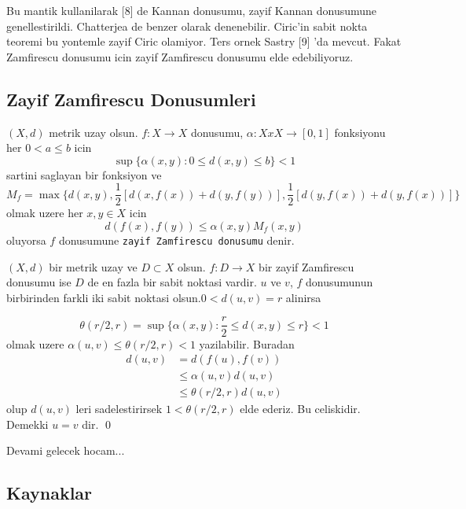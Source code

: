 \documentclass[10pt]{amsart}
\theoremstyle{plain}
\theoremstyle{definition}
\begin{document}
Bu mantik kullanilarak [8] de Kannan donusumu, zayif Kannan donusumune genellestirildi. Chatterjea de benzer olarak denenebilir. Ciric'in sabit nokta teoremi bu yontemle zayif Ciric olamiyor. Ters ornek Sastry [9] 'da mevcut. Fakat Zamfirescu donusumu icin zayif Zamfirescu donusumu elde edebiliyoruz.

\subsection*{Zayif Zamfirescu Donusumleri}
   $(X,d)$ metrik uzay olsun. $f:X \rightarrow X$ donusumu,
 $\alpha :XxX \rightarrow [0,1]$ fonksiyonu her $0<a\leq b$ icin 
\begin{equation*} 
  \sup\big\{\alpha(x,y) : 0\leq d(x,y) \leq b \big\} < 1
\end{equation*}
sartini saglayan bir fonksiyon ve
\begin{equation*} 
  M_f= \max\bigg\{ d(x,y), \frac{1}{2}[d(x,f(x))+d(y,f(y))], \frac{1}{2}[d(y,f(x))+d(y,f(x))] \bigg\}
\end{equation*}
olmak uzere her $x,y\in X$ icin
\begin{equation*} 
  d(f(x), f(y))\leq \alpha(x,y)M_f(x,y) 
\end{equation*}
oluyorsa $f$ donusumune \texttt{zayif Zamfirescu donusumu} denir.

\proposition  $(X,d)$ bir metrik uzay ve $D \subset X$ olsun. $f:D\rightarrow X$ bir zayif Zamfirescu donusumu ise $D$ de en fazla bir sabit noktasi vardir.
\kanit $u$ ve $v$, $f$ donusumunun birbirinden farkli iki sabit noktasi olsun.$0<d(u,v)=r$ alinirsa

\begin{equation*}
  \theta(r/2,r)= \sup\big\{\alpha(x,y) : \frac{r}{2}\leq d(x,y) \leq r \big\} < 1
\end{equation*}
olmak uzere  $\alpha(u,v)\leq \theta(r/2, r)<1$ yazilabilir. Buradan
\begin{align*}
d(u,v)&=d(f(u),f(v))\\ &\leq \alpha(u,v)d(u,v)\\
                    &\leq \theta(r/2,r)d(u,v)
\end{align*}
olup $d(u,v)$ leri sadelestirirsek $1<\theta(r/2,r)$ elde ederiz. Bu celiskidir. Demekki $u=v$ dir. \qed


Devami gelecek hocam...
\subsection*{Kaynaklar}
\end{document}
